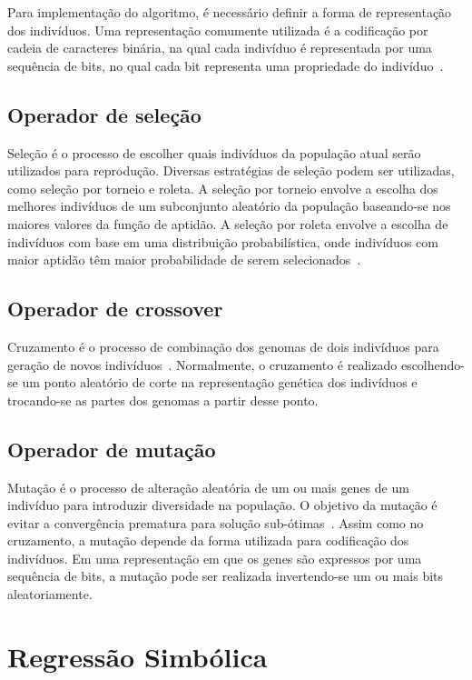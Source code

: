 Para implementação do algoritmo, é necessário definir a forma de representação dos indivíduos. Uma representação comumente utilizada é a codificação por cadeia de caracteres binária, na qual cada indivíduo é representada por uma sequência de bits, no qual cada bit representa uma propriedade do indivíduo~\cite{Katoch2021}.

\subsection{Operador de seleção}

Seleção é o processo de escolher quais indivíduos da população atual serão utilizados para reprodução. Diversas estratégias de seleção podem ser utilizadas, como seleção por torneio e roleta. A seleção por torneio envolve a escolha dos melhores indivíduos de um subconjunto aleatório da população baseando-se nos maiores valores da função de aptidão. A seleção por roleta envolve a escolha de indivíduos com base em uma distribuição probabilística, onde indivíduos com maior aptidão têm maior probabilidade de serem selecionados~\cite{Katoch2021}.

\subsection{Operador de crossover}

Cruzamento é o processo de combinação dos genomas de dois indivíduos para geração de novos indivíduos~\cite{galr,Katoch2021}. Normalmente, o cruzamento é realizado escolhendo-se um ponto aleatório de corte na representação genética dos indivíduos e trocando-se as partes dos genomas a partir desse ponto.

\subsection{Operador de mutação}

Mutação é o processo de alteração aleatória de um ou mais genes de um indivíduo para introduzir diversidade na população. O objetivo da mutação é evitar a convergência prematura para solução sub-ótimas~\cite{galr}. Assim como no cruzamento, a mutação depende da forma utilizada para codificação dos indivíduos. Em uma representação em que os genes são expressos por uma sequência de bits, a mutação pode ser realizada invertendo-se um ou mais bits aleatoriamente.

\section{Regressão Simbólica}

